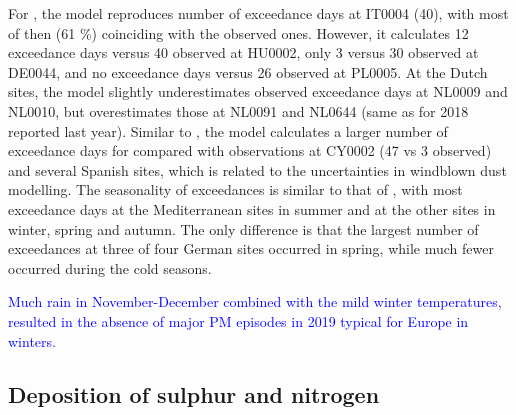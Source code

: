 For \PM[2.5], the model reproduces number of exceedance days at IT0004 (40), with most of then (61 \%) coinciding with the observed ones. However, it calculates 12 exceedance days versus 40 observed at HU0002, only 3 versus 30 observed at DE0044, and no exceedance days versus 26 observed at PL0005. At the Dutch sites, the model slightly underestimates observed \PM[2.5] exceedance days at NL0009 and NL0010, but overestimates those at NL0091 and NL0644 (same as for 2018 reported last year). Similar to \PM[10], the model calculates a larger number of exceedance days for \PM[2.5] compared with observations at CY0002 (47 vs 3 observed) and several Spanish sites, which is related to the uncertainties in windblown dust modelling. The seasonality of \PM[2.5] exceedances is similar to that of \PM[10], with most exceedance days at the Mediterranean sites in summer and at the other sites in winter, spring and autumn. The only difference is that the largest number of \PM[2.5] exceedances at three of four German sites occurred in spring, while much fewer occurred during the cold seasons.


\textcolor{blue}{Much rain in November-December combined with the mild winter temperatures, resulted in the absence of major PM episodes in 2019 typical for Europe in winters.} 

\subsection{Deposition of sulphur and nitrogen} %
\label{subs:dep}


